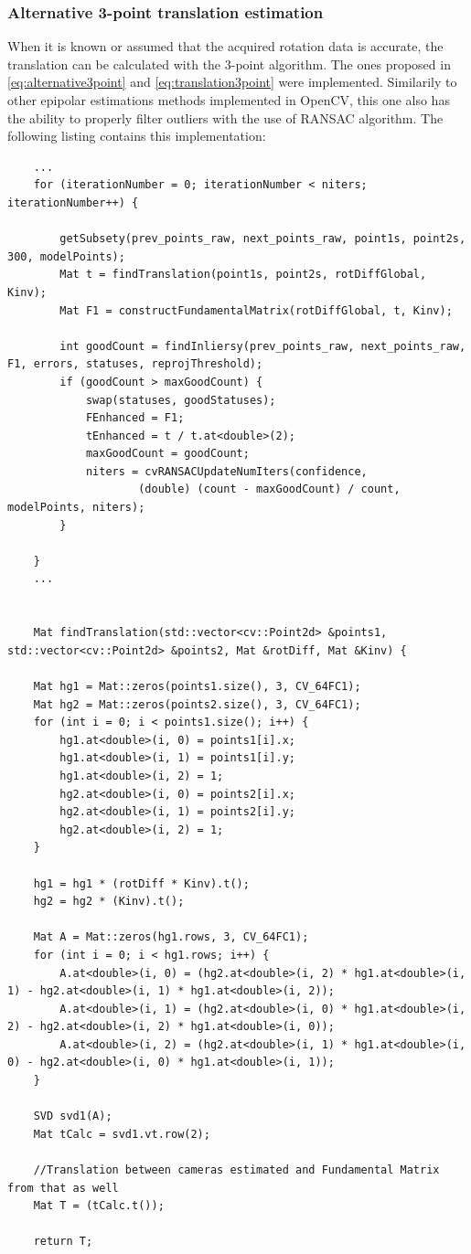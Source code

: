 \subsubsection{Alternative 3-point translation estimation}
When it is known or assumed that the acquired rotation data is accurate, the translation can be calculated with the 3-point algorithm. The ones proposed in \ref{eq:alternative3point} and \ref{eq:translation3point} were implemented. Similarily to other epipolar estimations methods implemented in OpenCV, this one also has the ability to properly filter outliers with the use of RANSAC algorithm. The following listing contains this implementation:
\begin{lstlisting}
    ...
    for (iterationNumber = 0; iterationNumber < niters; iterationNumber++) {

        getSubsety(prev_points_raw, next_points_raw, point1s, point2s, 300, modelPoints);
        Mat t = findTranslation(point1s, point2s, rotDiffGlobal, Kinv);
        Mat F1 = constructFundamentalMatrix(rotDiffGlobal, t, Kinv);

        int goodCount = findInliersy(prev_points_raw, next_points_raw, F1, errors, statuses, reprojThreshold);
        if (goodCount > maxGoodCount) {
            swap(statuses, goodStatuses);
            FEnhanced = F1;
            tEnhanced = t / t.at<double>(2);
            maxGoodCount = goodCount;
            niters = cvRANSACUpdateNumIters(confidence,
                    (double) (count - maxGoodCount) / count, modelPoints, niters);
        }

    }
    ...
    
    
    Mat findTranslation(std::vector<cv::Point2d> &points1, std::vector<cv::Point2d> &points2, Mat &rotDiff, Mat &Kinv) {

    Mat hg1 = Mat::zeros(points1.size(), 3, CV_64FC1);
    Mat hg2 = Mat::zeros(points2.size(), 3, CV_64FC1);
    for (int i = 0; i < points1.size(); i++) {
        hg1.at<double>(i, 0) = points1[i].x;
        hg1.at<double>(i, 1) = points1[i].y;
        hg1.at<double>(i, 2) = 1;
        hg2.at<double>(i, 0) = points2[i].x;
        hg2.at<double>(i, 1) = points2[i].y;
        hg2.at<double>(i, 2) = 1;
    }

    hg1 = hg1 * (rotDiff * Kinv).t();
    hg2 = hg2 * (Kinv).t();

    Mat A = Mat::zeros(hg1.rows, 3, CV_64FC1);
    for (int i = 0; i < hg1.rows; i++) {
        A.at<double>(i, 0) = (hg2.at<double>(i, 2) * hg1.at<double>(i, 1) - hg2.at<double>(i, 1) * hg1.at<double>(i, 2));
        A.at<double>(i, 1) = (hg2.at<double>(i, 0) * hg1.at<double>(i, 2) - hg2.at<double>(i, 2) * hg1.at<double>(i, 0));
        A.at<double>(i, 2) = (hg2.at<double>(i, 1) * hg1.at<double>(i, 0) - hg2.at<double>(i, 0) * hg1.at<double>(i, 1));
    }

    SVD svd1(A);
    Mat tCalc = svd1.vt.row(2);

    //Translation between cameras estimated and Fundamental Matrix from that as well
    Mat T = (tCalc.t());

    return T;

\end{lstlisting}
